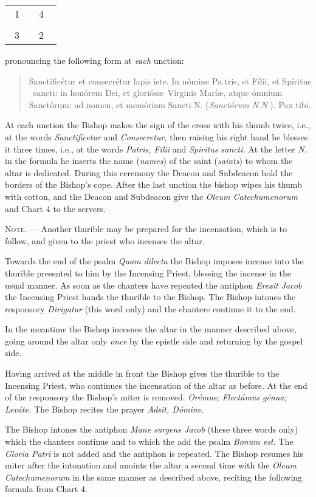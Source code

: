 \documentclass[letterpaper]{report}
\newcommand\crossplan{
\begin{center}
    \begin{tabular}{ | l c r | }
       \hline
        \cross\ {\tiny 1} &         & {\tiny 4} \cross\ \\
                           & \cross &           \\
        \cross\ {\tiny 3} &         & {\tiny 2} \cross\ \\
       \hline
   \end{tabular} 
\end{center}
}
\begin{document}
{\crossplan

pronouncing the following form at \textit{each} unction:

\begin{quote}
    Sancti\cross ficétur et conse\cross crétur lapis iste. In nómine Pa\cross
    tris, et Fí\cross lii, et Spíritus \cross\ sancti: in honórem Dei, et
    gloriós\ae\ Vírginis Marí\ae, atque ómnium Sanctórum: ad nomen, et memóriam
    Sancti N. (\textit{Sanctórum N.N.}). Pax tibi.
\end{quote}

At each unction the Bishop makes the sign of the cross with his thumb twice,
i.e., at the words \textit{Sanctificetur} and \textit{Consecretur,} then
raising his right hand he blesses it three times, i.e., at the words
\textit{Patris, Filii} and \textit{Spiritus sancti.} At the letter \textit{N.}
in the formula he inserts the name (\textit{names}) of the saint
(\textit{saints}) to whom the altar is dedicated. During this ceremony the
Deacon and Subdeacon hold the borders of the Bishop's cope. After the last
unction the bishop wipes his thumb with cotton, and the Deacon and Subdeacon
give the \textit{Oleum Catechumenorum} and Chart 4 to the servers.

\textsc{Note. ---} Another thurible may be prepared for the incensation, which
is to follow, and given to the priest who incenses the altar.

\rubric Towards the end of the psalm \textit{Quam dilecta} the Bishop imposes
incense into the thurible presented to him by the Incensing Priest, blessing
the incense in the usual manner. As soon as the chanters have repeated the
antiphon \textit{Erexit Jacob} the Incensing Priest hands the thurible to the
Bishop. The Bishop intones the responsory \textit{Dirigatur} (this word only)
and the chanters continue it to the end.

In the meantime the Bishop incesnes the altar in the manner described above,
going around the altar only \textit{once} by the epistle side and returning by
the gospel side.

\rubric Having arrived at the middle in front the Bishop gives the thurible to
the Incensing Priest, who continues the incensation of the altar as before. At
the end of the responsory the Bishop's miter is removed. \textit{Orémus;
Flectámus génua; Leváte.} The Bishop recites the prayer \textit{Adsit, Dómine.}

\rubric The Bishop intones the antiphon \textit{Mane surgens Jacob} (these
three words only) which the chanters continue and to which the add the psalm
\textit{Bonum est.} The \textit{Gloria Patri} is not added and the antiphon is
repeated. The Bishop resumes his miter after the intonation and anoints the
altar a second time with the \textit{Oleum Catechumenorum} in the same manner
as described above, reciting the following formula from Chart 4.

}
\end{document}
